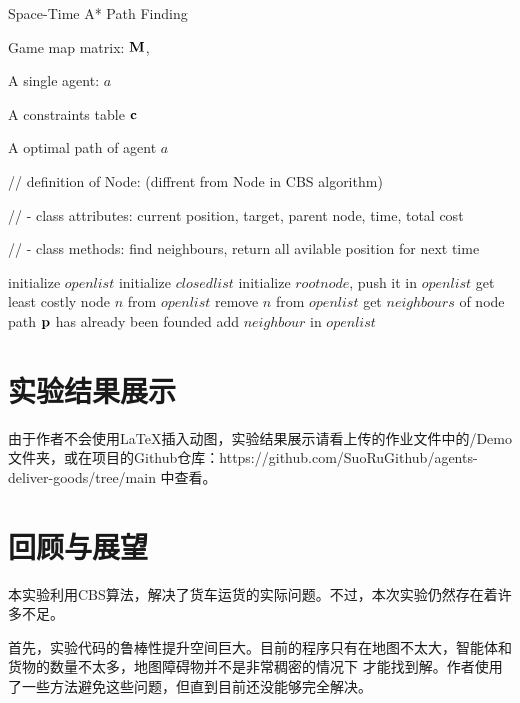 \documentclass[UTF8]{ctexart}  %
\begin{document}
\begin{algorithm}[H]
    \renewcommand{\algorithmicrequire}{\textbf{Input:}}
	\renewcommand{\algorithmicensure}{\textbf{Output:}}
    \caption{Space-Time A* Path Finding}
    \label{alg:example}
    \begin{algorithmic}[3]
        \REQUIRE 
            Game map matrix: $\bf M$,

            A single agent: $a$

            A constraints table $\bf c$ 
            
        \ENSURE
            A optimal path of agent $a$

        // definition of Node: (diffrent from Node in CBS algorithm)

        // - class attributes: current position, target, parent node, time, total cost      

        // - class methods: find neighbours, return all avilable position for next time
        

        \STATE initialize $open list$  
        \STATE initialize $closed list$
        \STATE initialize $root node$, push it in $open list$
            \STATE get least costly node $n$ from $open list$
            \STATE remove $n$ from $open list$
            \STATE get $neighbours$  of node
                    \STATE path $\bf p$ has already been founded
                \ELSE
                    \STATE add $neighbour$ in $open list$
                \ENDIF
            \ENDFOR
        \ENDWHILE
    \end{algorithmic}
\end{algorithm}

\section{实验结果展示}
由于作者不会使用\LaTeX 插入动图，实验结果展示请看上传的作业文件中的/Demo文件夹，或在项目的Github仓库：https://github.com/SuoRuGithub/agents-deliver-goods/tree/main
中查看。
\section{回顾与展望}
本实验利用CBS算法，解决了货车运货的实际问题。不过，本次实验仍然存在着许多不足。

首先，实验代码的鲁棒性提升空间巨大。目前的程序只有在地图不太大，智能体和货物的数量不太多，地图障碍物并不是非常稠密的情况下
才能找到解。作者使用了一些方法避免这些问题，但直到目前还没能够完全解决。
\end{document}
